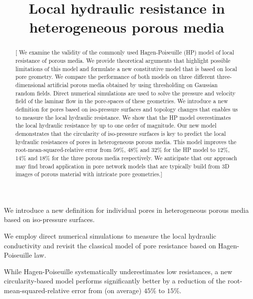 \documentclass[draft]{agujournal2019}
\begin{document}
\title{Local hydraulic resistance in heterogeneous porous media}











\begin{keypoints}
\item We introduce a new definition for individual pores in heterogeneous porous media based on iso-pressure surfaces.
\item We employ direct numerical simulations to measure the local hydraulic conductivity and revisit the classical model of pore resistance based on Hagen-Poiseuille law. 
\item While Hagen-Poiseuille systematically underestimates low resistances, a new circularity-based model performs significantly better by a reduction of the root-mean-squared-relative error from (on average) $45\%$ to $15\%$.
\end{keypoints}


\begin{abstract}
[ We examine the validity of the commonly used Hagen-Poiseuille (HP) model of local resistance of porous media. We provide theoretical arguments that highlight possible limitations of this model and formulate a new constitutive model that is based on local pore geometry. We compare the performance of both models on three different three-dimensional artificial porous media obtained by using thresholding on Gaussian random fields. Direct numerical simulations are used to solve the pressure and velocity field of the laminar flow in the pore-spaces of these geometries. We introduce a new definition for pores based on iso-pressure surfaces and topology changes that enables us to measure the local hydraulic resistance. We show that the HP model overestimates the local hydraulic resistance by up to one order of magnitude. Our new model demonstrates that the circularity of iso-pressure surfaces is key to predict the local hydraulic resistances of pores in heterogeneous porous media. This model improves the root-mean-squared-relative error from $59\%$, $48\%$ and $32\%$ for the HP model to $12\%$, $14\%$ and $18\%$ for the three porous media respectively. We anticipate that our approach may find broad application in pore network models that are typically build from 3D images of porous material with intricate pore geometries.]
\end{abstract}
\end{document}
